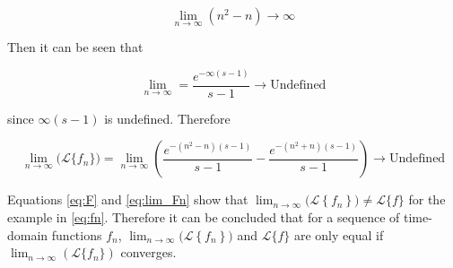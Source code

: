 \documentclass[a4paper,10pt,reqno]{amsart}
\numberwithin{equation}{section}
\newcommand{\lap}{\mathscr{L}}
\begin{document}
\begin{equation}
     \lim_{n \to \infty} (n^2 - n) \to \infty
\end{equation}
\vspace{1pt}

Then it can be seen that

\begin{equation}
     \lim_{n \to \infty} = \frac{e^{-\infty(s - 1)}}{s - 1} \to \text{Undefined}
\end{equation}
\vspace{1pt}

since $\infty(s - 1)$ is undefined. Therefore

\begin{equation}\label{eq:lim_Fn}
     \lim_{n \to \infty} \big(\lap\{f_n\}\big) = \lim_{n \to \infty} \left(\frac{e^{-(n^2 - n)(s-1)}}{s-1} - \frac{e^{-(n^2 + n)(s-1)}}{s-1}\right) \to \text{Undefined}
\end{equation}
\vspace{1pt}

Equations \eqref{eq:F} and \eqref{eq:lim_Fn} show that $\lim_{n \to \infty} \big(\lap\left\{f_n\right\}\big) \neq \lap\{f\}$ for the example in \eqref{eq:fn}. Therefore it can be concluded that for a sequence of time-domain functions $f_n$, $\lim_{n \to \infty} \big(\lap\left\{f_n\right\}\big)$ and $\lap\{f\}$ are only equal if $\lim_{n \to \infty} (\lap\{f_n\})$ converges.
\end{document}
